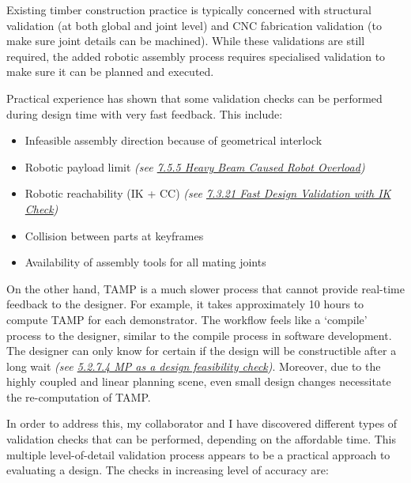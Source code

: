 
Existing timber construction practice is typically concerned with structural validation (at both global and joint level) and CNC fabrication validation (to make sure joint details can be machined). While these validations are still required, the added robotic assembly process requires specialised validation to make sure it can be planned and executed. 

Practical experience has shown that some validation checks can be performed during design time with very fast feedback. This include: 

\begin{itemize}
	\item Infeasible assembly direction because of geometrical interlock

	\item Robotic payload limit \textit{(see \uline{7.5.5 Heavy Beam Caused Robot Overload})}

	\item Robotic reachability (IK + CC) \textit{(see \uline{7.3.21 Fast Design Validation with IK Check})}

	\item Collision between parts at keyframes

	\item Availability of assembly tools for all mating joints

\end{itemize}
On the other hand, TAMP is a much slower process that cannot provide real-time feedback to the designer. For example, it takes approximately 10 hours to compute TAMP for each demonstrator. The workflow feels like a ‘compile’ process to the designer, similar to the compile process in software development. The designer can only know for certain if the design will be constructible after a long wait \textit{(see \uline{5.2.7.4 MP as a design feasibility check})}. Moreover, due to the highly coupled and linear planning scene, even small design changes necessitate the re-computation of TAMP.

In order to address this, my collaborator and I have discovered different types of validation checks that can be performed, depending on the affordable time. This multiple level-of-detail validation process appears to be a practical approach to evaluating a design. The checks in increasing level of accuracy are:

